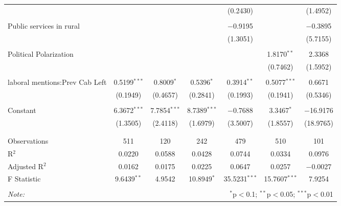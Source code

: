 \begin{table}[!htbp]
\begin{tabular}{@{\extracolsep{5pt}}lcccccc}
  &  &  &  & (0.2430) &  & (1.4952) \\ 
  & & & & & & \\ 
 Public services in rural &  &  &  & $-$0.9195 &  & $-$0.3895 \\ 
  &  &  &  & (1.3051) &  & (5.7155) \\ 
  & & & & & & \\ 
 Political Polarization &  &  &  &  & 1.8170$^{**}$ & 2.3368 \\ 
  &  &  &  &  & (0.7462) & (1.5952) \\ 
  & & & & & & \\ 
 laboral mentions:Prev Cab Left & 0.5199$^{***}$ & 0.8009$^{*}$ & 0.5396$^{*}$ & 0.3914$^{**}$ & 0.5077$^{***}$ & 0.6671 \\ 
  & (0.1949) & (0.4657) & (0.2841) & (0.1993) & (0.1941) & (0.5346) \\ 
  & & & & & & \\ 
 Constant & 6.3672$^{***}$ & 7.7854$^{***}$ & 8.7389$^{***}$ & $-$0.7688 & 3.3467$^{*}$ & $-$16.9176 \\ 
  & (1.3505) & (2.4118) & (1.6979) & (3.5007) & (1.8557) & (18.9765) \\ 
  & & & & & & \\ 
\hline \\[-1.8ex] 
Observations & 511 & 120 & 242 & 479 & 510 & 101 \\ 
R$^{2}$ & 0.0220 & 0.0588 & 0.0428 & 0.0744 & 0.0334 & 0.0976 \\ 
Adjusted R$^{2}$ & 0.0162 & 0.0175 & 0.0225 & 0.0647 & 0.0257 & $-$0.0027 \\ 
F Statistic & 9.6439$^{**}$ & 4.9542 & 10.8949$^{*}$ & 35.5231$^{***}$ & 15.7607$^{***}$ & 7.9254 \\ 
\hline 
\hline \\[-1.8ex] 
\textit{Note:}  & \multicolumn{6}{r}{$^{*}$p$<$0.1; $^{**}$p$<$0.05; $^{***}$p$<$0.01} \\ 
\end{tabular} 
\end{table} 
